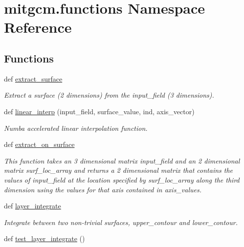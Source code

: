 \hypertarget{namespacemitgcm_1_1functions}{}\section{mitgcm.\+functions Namespace Reference}
\label{namespacemitgcm_1_1functions}
\subsection*{Functions}
\begin{DoxyCompactItemize}
\item 
def \hyperlink{namespacemitgcm_1_1functions_a0c92a8395bc703865868e6b0a2a35e49}{extract\+\_\+surface}
\begin{DoxyCompactList}\small\item\em Extract a surface (2 dimensions) from the input\+\_\+field (3 dimensions). \end{DoxyCompactList}\item 
def \hyperlink{namespacemitgcm_1_1functions_a5cd49a5bcc251ab496dd14eab9a9735f}{linear\+\_\+interp} (input\+\_\+field, surface\+\_\+value, ind, axis\+\_\+vector)
\begin{DoxyCompactList}\small\item\em Numba accelerated linear interpolation function. \end{DoxyCompactList}\item 
def \hyperlink{namespacemitgcm_1_1functions_a299918b57fada07023fdbb6ac4d6fb6e}{extract\+\_\+on\+\_\+surface}
\begin{DoxyCompactList}\small\item\em This function takes an 3 dimensional matrix \textquotesingle{}input\+\_\+field\textquotesingle{} and an 2 dimensional matrix \textquotesingle{}surf\+\_\+loc\+\_\+array\textquotesingle{} and returns a 2 dimensional matrix that contains the values of input\+\_\+field at the location specified by surf\+\_\+loc\+\_\+array along the third dimension using the values for that axis contained in \textquotesingle{}axis\+\_\+values\textquotesingle{}. \end{DoxyCompactList}\item 
def \hyperlink{namespacemitgcm_1_1functions_ab26c3c96d103e888d18a0378ebd78355}{layer\+\_\+integrate}
\begin{DoxyCompactList}\small\item\em Integrate between two non-\/trivial surfaces, \textquotesingle{}upper\+\_\+contour\textquotesingle{} and \textquotesingle{}lower\+\_\+contour\textquotesingle{}. \end{DoxyCompactList}\item 
def \hyperlink{namespacemitgcm_1_1functions_ab12baa939c3055bc4c9bceb54da9f16e}{test\+\_\+layer\+\_\+integrate} ()
\end{DoxyCompactItemize}


